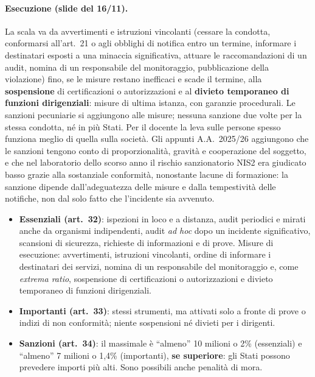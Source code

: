 \paragraph{Esecuzione (slide del 16/11).} La scala va da avvertimenti e istruzioni vincolanti (cessare
la condotta, conformarsi all'art.~21 o agli obblighi di notifica entro un termine, informare i
destinatari esposti a una minaccia significativa, attuare le raccomandazioni di un audit, nomina di un
responsabile del monitoraggio, pubblicazione della violazione) fino, se le misure restano inefficaci e
scade il termine, alla \textbf{sospensione} di certificazioni o autorizzazioni e al \textbf{divieto
temporaneo di funzioni dirigenziali}: misure di ultima istanza, con garanzie procedurali. Le sanzioni
pecuniarie si aggiungono alle misure; nessuna sanzione due volte per la stessa condotta, né in più
Stati. Per il docente la leva sulle persone spesso funziona meglio di quella sulla società. Gli appunti A.A.~2025/26 aggiungono che le sanzioni tengono conto di
proporzionalità, gravità e cooperazione del soggetto, e che nel laboratorio dello scorso anno il
rischio sanzionatorio NIS2 era giudicato basso grazie alla sostanziale conformità, nonostante lacune
di formazione: la sanzione dipende dall'adeguatezza delle misure e dalla tempestività delle notifiche,
non dal solo fatto che l'incidente sia avvenuto.

\begin{integrazione}[artt.~32--34]
\begin{itemize}
  \item \textbf{Essenziali (art.~32)}: ispezioni in loco e a distanza, audit periodici e mirati anche
    da organismi indipendenti, audit \emph{ad hoc} dopo un incidente significativo, scansioni di
    sicurezza, richieste di informazioni e di prove. Misure di esecuzione: avvertimenti, istruzioni
    vincolanti, ordine di informare i destinatari dei servizi, nomina di un responsabile del
    monitoraggio e, come \emph{extrema ratio}, sospensione di certificazioni o autorizzazioni e
    divieto temporaneo di funzioni dirigenziali.
  \item \textbf{Importanti (art.~33)}: stessi strumenti, ma attivati solo a fronte di prove o indizi
    di non conformità; niente sospensioni né divieti per i dirigenti.
  \item \textbf{Sanzioni (art.~34)}: il massimale è ``almeno'' 10 milioni o 2\% (essenziali) e
    ``almeno'' 7 milioni o 1,4\% (importanti), \textbf{se superiore}: gli Stati possono prevedere
    importi più alti. Sono possibili anche penalità di mora.
\end{itemize}
\end{integrazione}


